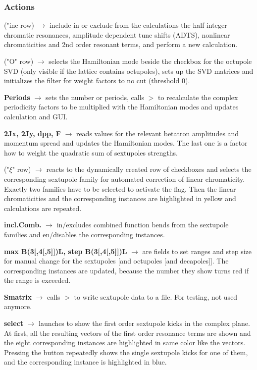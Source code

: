 \documentclass[12pt]{article}
\newcommand\code[1]{{\tt #1}}
\newcommand{\ofld}[1]{\colorbox{black!15}{{{\color{black}\bf #1}}}}
\newcommand{\ofldx}[1]{\colorbox{black!15}{{\color{black}(#1)}}}
\newcommand\guico[1]{{\color{blue}\code{#1}}}
\newcommand{\unico}[1]{{\color{burntorange}\code{#1}}}
\newcommand{\evcod}[2]{\ofld{#1} $\rightarrow$ \guico{#2}}
\newcommand{\evcodx}[2]{\ofldx{#1} $\rightarrow$ \guico{#2}}
\newcommand{\prcod}[2]{\opauni{#1}$>$\unico{#2}}
\newcommand{\opagui}[1]{\colorbox{blue!20}{{\color{black}\code{#1}}}}
\newcommand{\ogui}[1]{\hyperref[#1]{\opagui{#1}}}
\newcommand{\opaguif}[1]{\colorbox{violet!30}{{\color{black}\code{#1}}}}
\newcommand{\oguif}[1]{\hyperref[#1]{\opaguif{#1}}}
\newcommand{\opauni}[1]{\colorbox{orange!30}{{\color{black}\code{#1}}}}
\newcommand{\act}[1]{\subsubsection*{Actions} #1}
\newcommand{\todo}[1]{{\color{red} #1}}
\begin{document}
\act{
\evcodx{"inc row}{Check(2Q,Qxx,Cr2,Oct)Click} include in or exclude from the calculations the half integer chromatic resonances, amplitude dependent tune shifts (ADTS), nonlinear chromaticities and 2nd order resonant terms, and perform a new calculation.

\evcodx{"O" row}{CheckOctClick} selects the Hamiltonian mode beside the checkbox for the octupole SVD (only visible if the lattice contains octupoles), sets up the SVD matrices and initializes the filter for weight factors to no cut (threshold 0).

\evcod{Periods}{edPer(KeyPress,Exit)} sets the number or periods, calls \prcod{chromlib}{S\_Period} to recalculate the complex periodicity factors to be multiplied with the Hamiltonian modes and updates calculation and GUI.

\evcod{2Jx, 2Jy, dpp, F}{EdScPar(KeyPress,Exit)} reads values for the relevant betatron amplitudes and momentum spread and updates the Hamiltonian modes. The last one is a factor how to weight the quadratic sum of sextupoles strengths.

\evcodx{"$\xi$" row}{CSelectClick} reacts to the dynamically created row of checkboxes and selects the corresponding sextupole family for automated correction of linear chromaticity. Exactly two families have to be selected to activate the \guico{AutoChrom} flag. Then the linear chromaticities and the corresponding \oguif{csexframe} instances are highlighted in yellow and calculations are repeated.

\evcod{incl.Comb.}{ChkCombClick} in/excludes combined function bends from the sextupole families and en/disables the corresponding \oguif{csexframe} instances.

\evcod{max B(3[,4[,5]])L, step B(3[,4[,5]])L}{edSOD(KeyPress,Exit)} are fields to set ranges and step size for manual change for the sextupoles [and octupoles [and decapoles]]. The corresponding \oguif{csexframe} instances are updated, because the number they show turns red if the range is exceeded.

\evcod{Smatrix}{butSmatClick} calls \prcod{chromlib}{S\_TestOut} to write sextupole data to a file. \todo{For testing, not used anymore}.

\evcod{select}{butSelectClick} launches \ogui{ochromsvector} to show the first order sextupole kicks in the complex plane. At first, all the resulting vectors of the first order resonance terms are shown and the eight corresponding  \oguif{chamframe} instances are highlighted in same color like the vectors. Pressing the button repeatedly shows the single sextupole kicks for one of them, and the corresponding \oguif{chamframe} instance is highlighted in blue.

}
\end{document}
